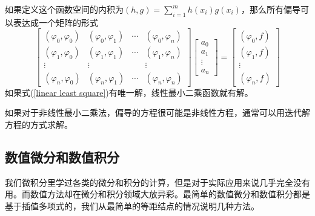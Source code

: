 \documentclass[12pt,a4paper,openany,twoside]{book}
\numberwithin{equation}{section}
\begin{document}
            如果定义这个函数空间的内积为$(h, g)=\sum_{i=1}^{m} h\left(x_{i}\right) g\left(x_{i}\right)$，那么所有偏导可以表达成一个矩阵的形式
            \begin{equation}
              \left[\begin{array}{cccc}
                {\left(\varphi_{0}, \varphi_{0}\right)} & {\left(\varphi_{0}, \varphi_{1}\right)}&{ \cdots}&{\left(\varphi_{0}, \varphi_{n}\right)} \\
                {\left(\varphi_{1}, \varphi_{0}\right)} & {\left(\varphi_{1}, \varphi_{1}\right) } & {\cdots} & {\left(\varphi_{1}, \varphi_{n}\right)} \\
                {\vdots} & {\vdots}&{} & {\vdots} \\
                {\left(\varphi_{n}, \varphi_{0}\right)} & {\left(\varphi_{n}, \varphi_{1}\right) } & {\cdots} & {\left(\varphi_{n}, \varphi_{n}\right)}
              \end{array}\right] \left[\begin{array}{c}
                {a_{0}} \\
                {a_{1}} \\
                {\vdots} \\
                {a_{n}}
              \end{array}\right]=\left[\begin{array}{c}
                {\left(\varphi_{0}, f\right)} \\
                {\left(\varphi_{1}, f\right)} \\
                {\vdots} \\
                {\left(\varphi_{n}, f\right)}
              \end{array}\right]
              \label{linear least square}
            \end{equation}
            如果式(\ref{linear least square})有唯一解，线性最小二乘函数就有解。

            如果对于非线性最小二乘法，偏导的方程很可能是非线性方程，通常可以用迭代解方程的方式求解。
          \subsection{数值微分和数值积分}
            我们微积分里学过各类的微分和积分的计算，但是对于实际应用来说几乎完全没有用。而数值方法却在微分和积分领域大放异彩。最简单的数值微分和数值积分都是基于插值多项式的，我们从最简单的等距结点的情况说明几种方法。
\end{document}
